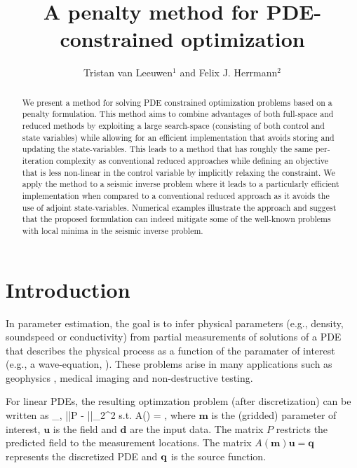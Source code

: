 \documentclass{iopart}
\begin{document}
\title[A penalty method for PDE-constrained optimization]{A penalty method for PDE-constrained optimization}
\author{Tristan van Leeuwen$^1$ and Felix J. Herrmann$^2$}
\address{$^1$Centrum Wiskunde \& Informatica. Science Park, Amsterdam, the Netherlands\\
$^2$ Dept. of Earth, Ocean and Atmospheric Sciences.\\2207 Main Mall, Vancouver, BC Canada V6T 1Z4.}

\begin{abstract}
We present a method for solving PDE constrained optimization problems
based on a penalty formulation. This method aims to combine advantages
of both full-space and reduced methods by exploiting a large
search-space (consisting of both control and state variables) while
allowing for an efficient implementation that avoids storing and
updating the state-variables. This leads to a method that has roughly
the same per-iteration complexity as conventional reduced approaches
while defining an objective that is less non-linear in the control
variable by implicitly relaxing the constraint. We apply the method to a
seismic inverse problem where it leads to a particularly efficient
implementation when compared to a conventional reduced approach as it
avoids the use of adjoint state-variables. Numerical examples illustrate
the approach and suggest that the proposed formulation can indeed
mitigate some of the well-known problems with local minima in the
seismic inverse problem.
\end{abstract}

\maketitle

\section{Introduction}
In parameter estimation, the goal is to infer physical parameters (e.g., density, soundspeed or conductivity) 
from partial measurements of solutions of a PDE that describes the physical process as a 
function of the paramater of interest (e.g., a wave-equation, ). These problems arise in many applications such as
geophysics \cite{Haber2004,Epanomeritakis08}, medical imaging \cite{Abdoulaev2005} and non-destructive testing.

For linear PDEs, the resulting optimzation problem (after discretization) can be written as
\bq
\label{eq:constr}
\min_{,} ||P - ||_2^2 \quad 
\mbox{s.t.} \quad A() = ,
\eq
where $\mathbf{m}$ is the (gridded) parameter of interest, $\mathbf{u}$ is the field and $\mathbf{d}$ are
the input data. The matrix $P$ restricts the predicted field to the measurement locations. 
The matrix $A(\mathbf{m})\mathbf{u} = \mathbf{q}$ represents the discretized PDE and $\mathbf{q}$ is the 
source function. 
\end{document}
